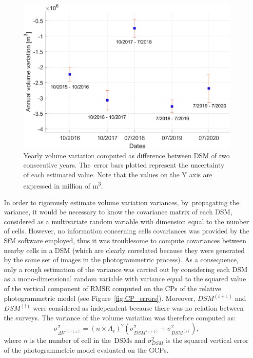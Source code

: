 \begin{figure}
    \centering
    \includegraphics[width=0.8\columnwidth]{volumes.png}
    \caption{Yearly volume variation computed as difference between DSM of two
        consecutive years. The~error bars plotted represent the uncertainty of each
        estimated
        value. Note that the values on the Y axis are expressed in million of
        \si{\cubic\meter}.}
    \label{fig:volumes}
\end{figure}

In order to rigorously estimate volume variation variances, by~propagating the variance,
it would be  necessary to know the covariance matrix of each DSM, considered as a
multivariate random variable with dimension equal to the number of cells.
However, no information concerning cells covariances was provided by the SfM software
employed, thus it was troublesome to compute covariances between nearby cells in a DSM
(which are clearly correlated because they were generated by the same set of images in
the photogrammetric process).
As a consequence, only a rough estimation of the variance was carried out by considering
each DSM as a mono-dimensional random variable with variance equal to the squared value
of the vertical component of RMSE computed on the CPs of the relative photogrammetric
model (see Figure~\ref{fig:CP_errors}).
Moreover, $ DSM^{(i+1)} $ and $ DSM^{(i)} $ were considered as independent because there
was no relation between the surveys.
The variance of the volume variation was therefore computed as:
\begin{equation}
    \sigma^2_{\Delta V^{(i+1,i)}}  = {(n \times A_c)}^2 \left( \sigma^2
    _{DSM^{(i+1)}} + \sigma^2_{DSM^{(i)}} \right),
    \label{eq:volVarProp}
\end{equation}
where $ n $ is the number of cell in the~DSMs and $ \sigma^2 _{DSM}$ is the squared
vertical error of the photogrammetric model evaluated on the GCPs.


